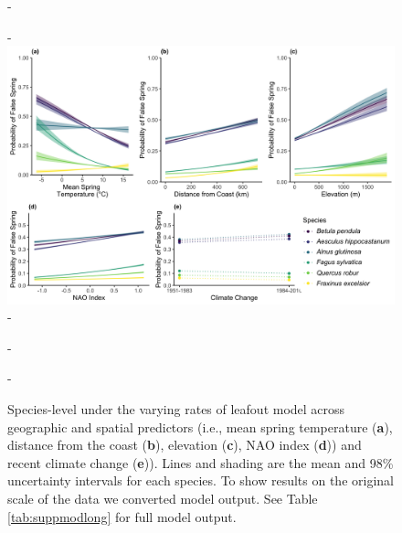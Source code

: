 \documentclass{article}\usepackage[]{graphicx}\usepackage[]{color}
\begin{document}
  {\begin{figure} [H]
  -\begin{center}
  -\includegraphics[width=16cm]{..//..//analyses/figures/InteractionPlots/Species_dvrlong.png}
  -\caption{Species-level under the varying rates of leafout model across geographic and spatial predictors (i.e., mean spring temperature (\textbf{a}), distance from the coast (\textbf{b}), elevation (\textbf{c}), NAO index (\textbf{d})) and recent climate change (\textbf{e})). Lines and shading are the mean and 98\% uncertainty intervals for each species. To show results on the original scale of the data we converted model output. See Table \ref{tab:suppmodlong} for full model output. }\label{fig:sppdvr}
  -\end{center}
  -\end{figure}}
\end{document}
